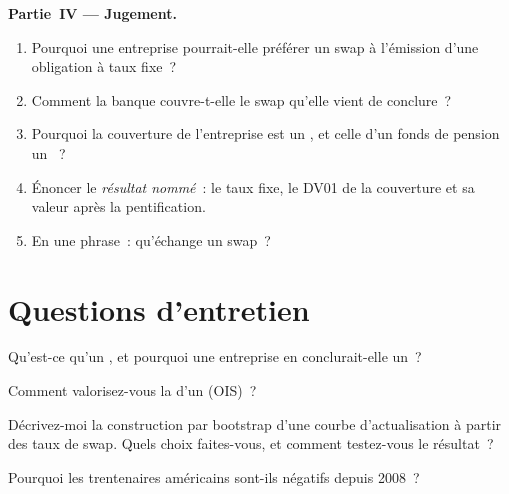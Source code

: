 \begin{problem}
\medskip\noindent\textbf{Partie~IV --- Jugement.}
\begin{enumerate}[resume]
\item Pourquoi une entreprise pourrait-elle préférer un swap à l'émission d'une obligation à taux fixe~?
\item Comment la banque couvre-t-elle le swap qu'elle vient de conclure~?
\item Pourquoi la couverture de l'entreprise est un , et celle d'un fonds de pension
un ~?
\item Énoncer le \emph{résultat nommé}~: le taux fixe, le DV01 de la couverture et sa
valeur après la pentification.
\item En une phrase~: qu'échange un swap~?
\end{enumerate}
\end{problem}

\section{Questions d'entretien}

\begin{interviewq}\label{iq:m2:interest-rate-swaps:1}
Qu'est-ce qu'un , et pourquoi une entreprise en conclurait-elle un~?
\end{interviewq}

\begin{interviewq}\label{iq:m2:interest-rate-swaps:2}
Comment valorisez-vous la  d'un  (OIS)~?
\end{interviewq}

\begin{interviewq}\label{iq:m2:interest-rate-swaps:3}
Décrivez-moi la construction par bootstrap d'une courbe d'actualisation à partir des taux de swap. Quels
choix faites-vous, et comment testez-vous le résultat~?
\end{interviewq}

\begin{interviewq}\label{iq:m2:interest-rate-swaps:4}
Pourquoi les  trentenaires américains sont-ils négatifs depuis 2008~?
\end{interviewq}

